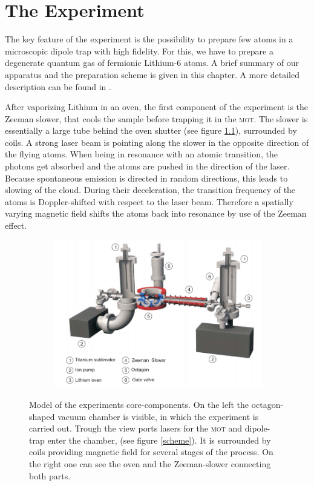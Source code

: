 \chapter{The Experiment}


The key feature of the experiment is the possibility to prepare few atoms in a microscopic dipole trap with high fidelity. For this, we have to prepare a degenerate quantum gas of fermionic Lithium-6 atoms. A brief summary of our apparatus and the preparation scheme is given in this chapter. A more detailed description can be found in \cite{friedhelm}. 

After vaporizing Lithium in an oven, the first component of the experiment is the Zeeman slower, that cools the sample before trapping it in the \textsc{mot}. The slower is essentially a large tube behind the oven shutter (see figure \ref{experiment}), surrounded by coils. A strong laser beam is pointing along the slower in the opposite direction of the flying atoms. When being in resonance with an atomic transition, the photons get absorbed and the atoms are pushed in the direction of the laser. Because spontaneous emission is directed in random directions, this leads to slowing of the cloud. During their deceleration, the transition frequency of the atoms is Doppler-shifted with respect to the laser beam. Therefore a spatially varying magnetic field shifts the atoms back into resonance by use of the Zeeman effect. 
\begin{figure}[h]
\centering
\begin{subfigure}[b]{0.8\textwidth}
                \includegraphics[width=\textwidth]{exsetup}
\end{subfigure}
\caption{Model of the experiments core-components. On the left the octagon-shaped vacuum chamber is visible, in which the experiment is carried out. Trough the view ports lasers for the \textsc{mot} and dipole-trap enter the chamber, (see figure \ref{scheme}). It is surrounded by coils providing magnetic field for several stages of the process. On the right one can see the oven and the Zeeman-slower connecting both parts.}
\label{experiment}
\end{figure}


